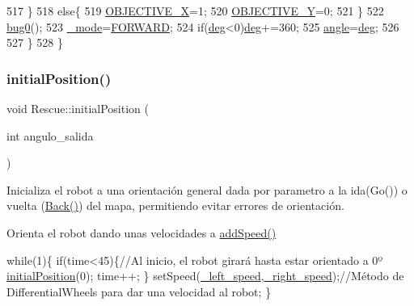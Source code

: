 \begin{DoxyCode}
517      \}
518      \textcolor{keywordflow}{else}\{
519        \hyperlink{classRescue_a8a98fdaa1deed080b4f8798f769f46cc_a8a98fdaa1deed080b4f8798f769f46cc}{OBJECTIVE\_X}=1;
520       \hyperlink{classRescue_a54840a89d4f27081c433d70e1a78022f_a54840a89d4f27081c433d70e1a78022f}{OBJECTIVE\_Y}=0;
521      \}
522      \hyperlink{classRescue_a4e3ec37a662b2cb91df3dcb0a875acf9_a4e3ec37a662b2cb91df3dcb0a875acf9}{bug0}();
523      \hyperlink{classRescue_a70a5e292c84029568ff6c0de2f2d9f43_a70a5e292c84029568ff6c0de2f2d9f43}{\_mode}=\hyperlink{classRescue_ab44ced9ce57b1b0d19b5456cd952d702_ab44ced9ce57b1b0d19b5456cd952d702ac5b8fd2a28d3d22c89095ccb90ea6e2a}{FORWARD};
524      \textcolor{keywordflow}{if}(\hyperlink{classRescue_ad6febda0e181e1b6847e1b9be0f54e2b_ad6febda0e181e1b6847e1b9be0f54e2b}{deg}<0)\hyperlink{classRescue_ad6febda0e181e1b6847e1b9be0f54e2b_ad6febda0e181e1b6847e1b9be0f54e2b}{deg}+=360;
525      \hyperlink{classRescue_a5bb8010f938dbe020a183b486772afe4_a5bb8010f938dbe020a183b486772afe4}{angle}=\hyperlink{classRescue_ad6febda0e181e1b6847e1b9be0f54e2b_ad6febda0e181e1b6847e1b9be0f54e2b}{deg};
526      
527   \}
528 \}
\end{DoxyCode}
\mbox{\label{classRescue_a3c978120304fcdbe702f3e306bef6c02_a3c978120304fcdbe702f3e306bef6c02}} 
\subsubsection{\texorpdfstring{initial\+Position()}{initialPosition()}}
{\footnotesize\ttfamily void Rescue\+::initial\+Position (\begin{DoxyParamCaption}\item[{int}]{angulo\+\_\+salida }\end{DoxyParamCaption})}



Inicializa el robot a una orientación general dada por parametro a la ida(\+Go()) o vuelta (\hyperlink{classRescue_a5acc91c16b60baf09a87f440a22f030f_a5acc91c16b60baf09a87f440a22f030f}{Back()}) del mapa, permitiendo evitar errores de orientación. 

Orienta el robot dando unas velocidades a \hyperlink{classRescue_a9a430924f65d71eca4e02dc9b2704947_a9a430924f65d71eca4e02dc9b2704947}{add\+Speed()} 
\begin{DoxyCode}
\textcolor{keywordflow}{while}(1)\{
    \textcolor{keywordflow}{if}(time<45)\{\textcolor{comment}{//Al inicio, el robot girará hasta estar orientado a 0º}
        \hyperlink{classRescue_a3c978120304fcdbe702f3e306bef6c02_a3c978120304fcdbe702f3e306bef6c02}{initialPosition}(0);
        time++;
    \}
    setSpeed(\hyperlink{classRescue_a29d594459f17968e6db993605d239c47_a29d594459f17968e6db993605d239c47}{\_left\_speed},\hyperlink{classRescue_ab2fac6f0352d593bfc083709ecc9ddc1_ab2fac6f0352d593bfc083709ecc9ddc1}{\_right\_speed});\textcolor{comment}{//Método de DifferentialWheels para dar una
       velocidad al robot;}
\}
\end{DoxyCode}
 
